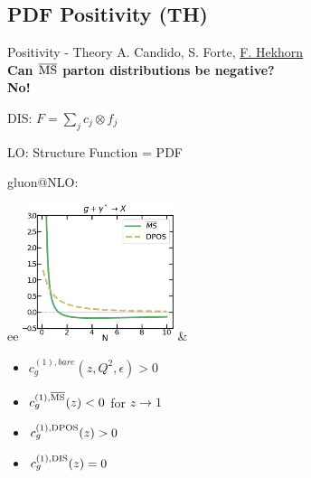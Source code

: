 \author[Felix Hekhorn]{}

\newcommand{\mmsbar}{{\overline{\rm {MS}}}}
\newcommand{\msbar}{$\mmsbar$}

\subsection{PDF Positivity (TH)}

\begin{frame}{Positivity - Theory}
A. Candido, S. Forte, \underline{F. Hekhorn} \\
{\bf Can \msbar{} parton distributions be negative?}\\
{\large \hfill \bf No!}

DIS: $F = \sum_j c_j \otimes f_j$

LO: Structure Function = PDF \checkmark

gluon@NLO:\\
\begin{tabular}{ee}
\includegraphics[height=4cm]{felix_positivity/disg.png}
&
\begin{itemize}
\item $c_g^{(1), bare}(z,Q^2,\epsilon) > 0$ \checkmark
\item $c_g^{(1), \mmsbar}(z) < 0$ for $z \to 1$
\item $c_g^{(1), \rm{DPOS}}(z) > 0$ \checkmark
\item $c_g^{(1), \rm{DIS}}(z) = 0$ \checkmark
\end{itemize}
\end{tabular}

\end{frame}

